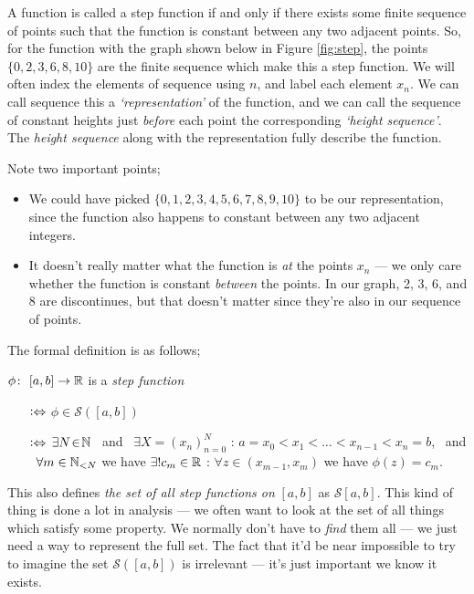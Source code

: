 A function is called a step function if and only if there exists some finite sequence of points such that the function is constant between any two adjacent points. So, for the function with the graph shown below in Figure \ref{fig:step}, the points $\{0, 2, 3, 6, 8, 10\}$ are the finite sequence which make this a step function. We will often index the elements of sequence using $n$, and label each element $x_n$. We can call sequence this a \emph{`representation'} of the function, and we can call the sequence of constant heights just \emph{before} each point the corresponding \emph{`height sequence'}. The \emph{height sequence} along with the representation fully describe the function.

\medskip
Note two important points;
\begin{itemize}
	\item We could have picked $\{0, 1, 2, 3, 4, 5, 6, 7, 8, 9, 10\}$ to be our representation, since the function also happens to constant between any two adjacent integers. 
	\item It doesn't really matter what the function is {\em at} the points $x_n$ --- we only care whether the function is constant {\em between} the points. In our graph, 2, 3, 6, and 8 are discontinues, but that doesn't matter since they're also in our sequence of points. 
\end{itemize}

The formal definition is as follows;
\begin{definition}
    $\phi\colon \ [a, b] \rightarrow \mathbb{R}$ is a {\em step function}
    \begin{itemize}
        \item[$\mathrel{\vcentcolon\Leftrightarrow}$]
            $\phi \in \mathcal{S}([a, b])$
        \item[$\mathrel{\vcentcolon\Leftrightarrow}$]
            $\exists N \! \in \! \mathbb{N}$ \ and \ $\exists X = (x_n)_{n=0}^N$ : $a = x_0 < x_1 < \ldots < x_{n-1} < x_n = b$, \ and \ $\forall m\in\mathbb{N}_{< N}$ we have $\exists! c_m \in \mathbb{R}$ : $\forall z \in (x_{m-1}, x_{m})$ we have $\phi(z) = c_m$.
    \end{itemize}
\end{definition}

This also defines \emph{the set of all step functions on} $[a, b]$ as $\mathcal{S}[a, b]$. This kind of thing is done a lot in analysis --- we often want to look at the set of all things which satisfy some property. We normally don't have to \emph{find} them all --- we just need a way to represent the full set. The fact that it'd be near impossible to try to imagine the set $\mathcal{S}([a, b])$ is irrelevant --- it's just important we know it exists.

